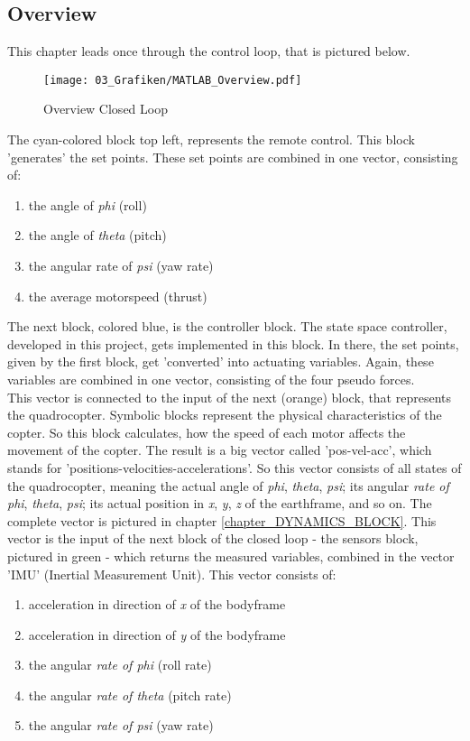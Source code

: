\subsection{Overview}\label{chapter_OVERVIEW}
This chapter leads once through the control loop, that is pictured below.
\begin{figure}[H]
	\centering
		\texttt{[image: 03\_Grafiken/MATLAB\_Overview.pdf]}
	\caption{Overview Closed Loop}
	\label{fig:MATLAB Overview}
\end{figure}
The cyan-colored block top left, represents the remote control. This block 'generates' the set points. These set points are combined in one vector, consisting of:
\begin{enumerate}
	\item the angle of \textit{phi} (roll)
	\item the angle of \textit{theta} (pitch)
	\item the angular rate of \textit{psi} (yaw rate)
	\item the average motorspeed (thrust)
\end{enumerate}
The next block, colored blue, is the controller block. The state space controller, developed in this project, gets implemented in this block. In there, the set points, given by the first block, get 'converted' into actuating variables. Again, these variables are combined in one vector, consisting of the four pseudo forces.\\
This vector is connected to the input of the next (orange) block, that represents the quadrocopter. Symbolic blocks represent the physical characteristics of the copter. So this block calculates, how the speed of each motor affects the movement of the copter. The result is a big vector called 'pos-vel-acc', which stands for 'positions-velocities-accelerations'. So this vector consists of all states of the quadrocopter, meaning the actual angle of \textit{phi}, \textit{theta}, \textit{psi}; its angular \textit{rate of phi}, \textit{theta}, \textit{psi}; its actual position in \textit{x}, \textit{y}, \textit{z} of the earthframe, and so on. The complete vector is pictured in chapter \ref {chapter_DYNAMICS_BLOCK}.
This vector is the input of the next block of the closed loop - the sensors block, pictured in green - which returns the measured variables, combined in the vector 'IMU' (Inertial Measurement Unit). This vector consists of:
\begin{enumerate}
	\item acceleration in direction of \textit{x} of the bodyframe
	\item acceleration in direction of \textit{y} of the bodyframe
	\item the angular \textit{rate of phi} (roll rate)
	\item the angular \textit{rate of theta} (pitch rate)
	\item the angular \textit{rate of psi} (yaw rate)
\end{enumerate}
